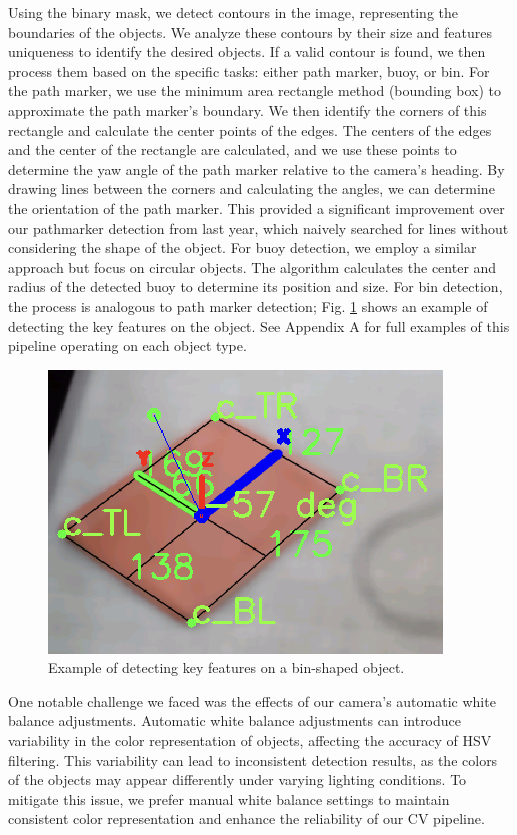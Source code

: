 \documentclass[conference]{IEEEtran}
\begin{document}
Using the binary mask, we detect contours in the image, representing the boundaries of the objects. We analyze these contours by their size and features uniqueness to identify the desired objects. If a valid contour is found, we then process them based on the specific tasks: either path marker, buoy, or bin. For the path marker, we use the minimum area rectangle method (bounding box) to approximate the path marker's boundary. We then identify the corners of this rectangle and calculate the center points of the edges. The centers of the edges and the center of the rectangle are calculated, and we use these points to determine the yaw angle of the path marker relative to the camera's heading. By drawing lines between the corners and calculating the angles, we can determine the orientation of the path marker. This provided a significant improvement over our pathmarker detection from last year, which naively searched for lines without considering the shape of the object. For buoy detection, we employ a similar approach but focus on circular objects. The algorithm calculates the center and radius of the detected buoy to determine its position and size. For bin detection, the process is analogous to path marker detection; Fig. \ref{fig:bin_features} shows an example of detecting the key features on the object. See Appendix A for full examples of this pipeline operating on each object type.

\begin{figure}[htbp]
    \centerline{\includegraphics[scale=0.55]{images/bin_features.png}}
    \caption{Example of detecting key features on a bin-shaped object.}
    \label{fig:bin_features}
\end{figure}

One notable challenge we faced was the effects of our camera's automatic white balance adjustments. Automatic white balance adjustments can introduce variability in the color representation of objects, affecting the accuracy of HSV filtering. This variability can lead to inconsistent detection results, as the colors of the objects may appear differently under varying lighting conditions. To mitigate this issue, we prefer manual white balance settings to maintain consistent color representation and enhance the reliability of our CV pipeline.
\end{document}
